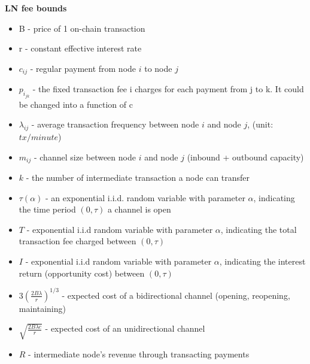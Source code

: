 \documentclass[12pt]{article}
\theoremstyle{plain}
\theoremstyle{remark}
\theoremstyle{definition}
\begin{document}
\begin{center}
\begin{Large}
\textbf{LN fee bounds}

\end{Large}
\end{center}

\begin{itemize}
  \item B - price of 1 on-chain transaction
  \item r - constant effective interest rate
  \item $c_{ij}$ - regular payment from node $i$ to node $j$
  \item $p_{i_{jk}}$ - the fixed transaction fee i charges for each payment from j to k. It could be changed into a function of c
  \item $\lambda_{ij}$ - average transaction frequency between node $i$ and node $j$, (unit: $tx/minute$)
  \item $m_{ij}$ - channel size between node $i$ and node $j$ (inbound + outbound capacity)
  \item $k$ - the number of intermediate transaction a node can transfer
  \item $\tau(\alpha)$ - an exponential i.i.d. random variable with parameter $\alpha$, indicating the time period $(0,\tau)$ a channel is open 
  \item $T$ - exponential i.i.d random variable with parameter $\alpha$, indicating the total transaction fee charged between $(0,\tau)$
  \item $I$ - exponential i.i.d random variable with parameter $\alpha$, indicating the interest return (opportunity cost) between $(0,\tau)$
  \item $3(\frac{2B\lambda}{r})^{1/3}$ - expected cost of a bidirectional channel (opening, reopening, maintaining)
  \item $\sqrt{\frac{2B\lambda c}{r}}$ - expected cost of an unidirectional channel
  \item $R$ - intermediate node's revenue through transacting payments
\end{itemize}
\end{document}
